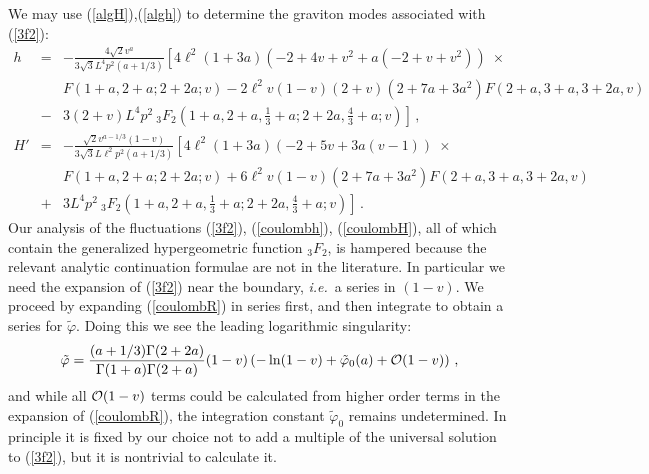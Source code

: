 \documentclass[a4paper,12pt]{article}
\def\varphit{\tilde{\varphi}}
\begin{document}
We may use (\ref{algH}),(\ref{algh}) to determine the graviton modes
associated with (\ref{3f2}):
\begin{eqnarray}
\label{coulombh}
h &=& - \frac{4 \sqrt{2} v^a}{3 \sqrt{3} L^4 p^2 (a+1/3)} \left[ 4
\ell^2(1+3a) (-2+4v+v^2 + a(-2+v+v^2)) \; \times \right. \\ 
&& F(1+a,2+a;2+2a;v) - 2 \ell^2 v(1-v)(2+v) (2+7a+3a^2) F(2+a,3+a,3+2a,v)
\nonumber\\   &-&3  \left. (2+v) L^4 p^2 \: _3F_2 \left( 1+a, 2+a,
\frac{1}{3} +a; 2+2a, \frac{4}{3} +a; v \right) \right]  \,, \nonumber \\
\label{coulombH}
H' &=& - \frac{ \sqrt{2} v^{a-1/3}(1-v)}{3 \sqrt{3} L \ell^2 p^2
(a+1/3)} \left[ 4 \ell^2(1+3a) (-2+5v + 3a(v-1)) \; \times \right. \\ 
&& F(1+a,2+a;2+2a;v) +6 \ell^2 v(1-v) (2+7a+3a^2)
F(2+a,3+a,3+2a,v) \nonumber\\ &+& \left. 3 L^4 p^2 \: _3F_2 \left(
1+a, 2+a, \frac{1}{3} +a; 2+2a, \frac{4}{3} +a; v \right) \right] \,.
\nonumber
\end{eqnarray}
Our analysis of the fluctuations (\ref{3f2}), (\ref{coulombh}),
(\ref{coulombH}), all of which contain the generalized hypergeometric
function $_3F_2$, is hampered because the relevant analytic
continuation formulae are not in the literature.  In particular we
need the expansion of (\ref{3f2}) near the boundary, {\em i.e.}\ a
series in $(1-v)$. We proceed by expanding (\ref{coulombR}) in series
first, and then integrate to obtain a series for $\varphit$.  Doing
this we see the leading logarithmic singularity:
\begin{eqnarray}
\label{3f2series}
\varphit = \frac{(a+1/3) \Gamma(2+2a)}{\Gamma(1+a)\Gamma(2+a)}(1-v) \left(
- \ln(1-v) + \varphit_0(a)  +{\cal O}(1-v) \right) \,,
\end{eqnarray}
and while all ${\cal O}(1-v)$ terms could be calculated from higher
order terms in the expansion of (\ref{coulombR}), the integration
constant $\varphit_0$ remains undetermined.  In principle it is fixed
by our choice not to add a multiple of the universal solution to
(\ref{3f2}), but it is nontrivial to calculate it.
\end{document}
